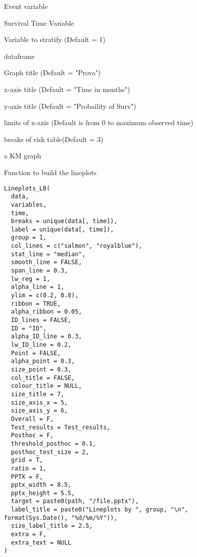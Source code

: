 \documentclass[a4paper]{book}
\begin{document}
\begin{Arguments}
\begin{ldescription}
\item[\code{Event}] Event variable

\item[\code{tEvent}] Survival Time Variable

\item[\code{strata}] Variable to stratify (Default = 1)

\item[\code{data}] dataframe

\item[\code{title}] Graph title (Default = "Prova")

\item[\code{xlab}] x-axis title (Default = "Time in months")

\item[\code{ylab}] y-axis title (Default = "Probaility of Surv")

\item[\code{xlim}] limits of x-axis (Default is from 0 to maximum observed time)

\item[\code{breaks\_by}] breaks of risk table(Default = 3)
\end{ldescription}
\end{Arguments}
%
\begin{Value}
a KM graph
\end{Value}
%
\begin{Description}
Function to build the lineplots
\end{Description}
%
\begin{Usage}
\begin{verbatim}
Lineplots_LB(
  data,
  variables,
  time,
  breaks = unique(data[, time]),
  label = unique(data[, time]),
  group = 1,
  col_lines = c("salmon", "royalblue"),
  stat_line = "median",
  smooth_line = FALSE,
  span_line = 0.3,
  lw_reg = 1,
  alpha_line = 1,
  ylim = c(0.2, 0.8),
  ribbon = TRUE,
  alpha_ribbon = 0.05,
  ID_lines = FALSE,
  ID = "ID",
  alpha_ID_line = 0.3,
  lw_ID_line = 0.2,
  Point = FALSE,
  alpha_point = 0.3,
  size_point = 0.3,
  col_title = FALSE,
  colour_title = NULL,
  size_title = 7,
  size_axis_x = 5,
  size_axis_y = 6,
  Overall = F,
  Test_results = Test_results,
  Posthoc = F,
  threshold_posthoc = 0.1,
  posthoc_test_size = 2,
  grid = T,
  ratio = 1,
  PPTX = F,
  pptx_width = 8.5,
  pptx_height = 5.5,
  target = paste0(path, "/file.pptx"),
  label_title = paste0("Lineplots by ", group, "\n", format(Sys.Date(), "%d/%m/%Y")),
  size_label_title = 2.5,
  extra = F,
  extra_text = NULL
)
\end{verbatim}
\end{Usage}
\end{document}
